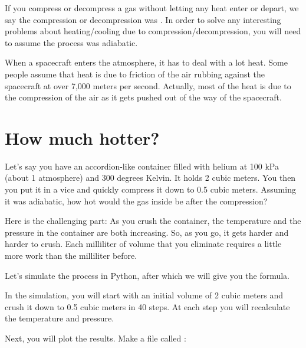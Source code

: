 If you compress or decompress a gas without letting any heat enter or depart, we say the compression or decompression was . In order to solve any interesting problems about heating/cooling due to compression/decompression, you will need to assume the process was adiabatic.

When a spacecraft enters the atmosphere, it has to deal with a lot heat. Some people assume that heat is due to friction of the air rubbing against the 
spacecraft at over 7,000 meters per second. Actually, most of the heat is due to the compression of the air as it gets pushed out of the way of the spacecraft.

\section{How much hotter?}

Let's say you have an accordion-like container filled with helium at 100 kPa (about 1 atmosphere) and 300 degrees Kelvin. It holds 2 cubic meters. You then you put it in a vice and quickly compress it down to 0.5 cubic meters. Assuming it was adiabatic, how hot would the gas inside be after the compression?

Here is the challenging part: As you crush the container, the temperature and the pressure in the container are both increasing. So, as you go, it gets harder and harder to crush. Each milliliter of volume that you eliminate requires a little more work than the milliliter before.

Let's simulate the process in Python, after which we will give you the formula. 

In the simulation, you will start with an initial volume of 2 cubic meters and crush it down to 0.5 cubic meters in 40 steps. At each step you will recalculate the temperature and pressure.

Next, you will plot the results. Make a file called :

